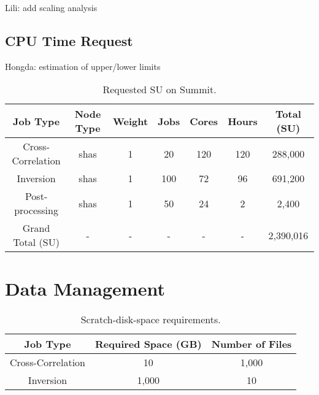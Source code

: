 {\color{red}Lili: add scaling analysis}

\subsection{CPU Time Request}

{\color{red}Hongda: estimation of upper/lower limits}

\begin{table}
\centering
\begin{tabular}{| c | c | c | c | c | c | c|}
\hline
 Job Type & Node Type & Weight & Jobs& Cores & Hours & Total (SU)  \\\hline
Cross-Correlation  & shas & 1 & 20 & 120 & 120 & 288,000 \\
Inversion & shas & 1 & 100 & 72 & 96 & 691,200 \\
Post-processing  & shas & 1 & 50 & 24 & 2 & 2,400 \\\hline
Grand Total (SU)  & - & - &- & - &- &  2,390,016 \\\hline
\end{tabular}
\caption{\label{tab:SU}Requested SU on Summit.}
\end{table}

\section{Data Management}


\begin{table}
\centering
\begin{tabular}{| c | c | c |}
\hline
 Job Type & Required Space (GB) & Number of Files \\\hline
Cross-Correlation  & 10 & 1,000 \\
Inversion & 1,000 & 10  \\ \hline
\end{tabular}
\caption{\label{tab:storage}Scratch-disk-space requirements.}
\end{table}



